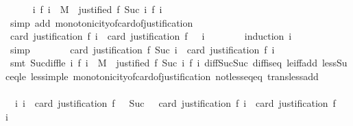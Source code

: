 \begin{isabellebody}
\ \ \ \ \isamarkupfalse%
\ {\isacartoucheopen}{\isasymforall}i{\isachardot}\ f\ i\ {\isasymin}\ M\ {\isasymand}\ justified\ {\isacharparenleft}f\ {\isacharparenleft}Suc\ i{\isacharparenright}{\isacharparenright}\ {\isacharparenleft}f\ i{\isacharparenright}{\isacartoucheclose}\ \isamarkupfalse%
\ {\isacharparenleft}simp\ add{\isacharcolon}\ monotonicity{\isacharunderscore}of{\isacharunderscore}card{\isacharunderscore}of{\isacharunderscore}justification{\isacharparenright}\isanewline
\ \ \ \ \isamarkupfalse%
\ {\isachardoublequoteopen}card\ {\isacharparenleft}justification\ {\isacharparenleft}f\ i{\isacharparenright}{\isacharparenright}\ {\isasymle}\ card\ {\isacharparenleft}justification\ {\isacharparenleft}f\ {}{\isacharparenright}{\isacharparenright}\ {\isacharminus}\ i{\isachardoublequoteclose}\isanewline
\ \ \ \ \ \ \isamarkupfalse%
\ {\isacharparenleft}induction\ i{\isacharparenright}\isanewline
\ \ \ \ \ \ \isamarkupfalse%
\ simp\isanewline
\ \ \ \ \ \ \isamarkupfalse%
\ {\isacartoucheopen}card\ {\isacharparenleft}justification\ {\isacharparenleft}f\ {\isacharparenleft}Suc\ i{\isacharparenright}{\isacharparenright}{\isacharparenright}\ {\isacharless}\ card\ {\isacharparenleft}justification\ {\isacharparenleft}f\ i{\isacharparenright}{\isacharparenright}{\isacartoucheclose}\isanewline
\ \ \ \ \ \ \isamarkupfalse%
\ {\isacharparenleft}smt\ Suc{\isacharunderscore}diff{\isacharunderscore}le\ {\isacartoucheopen}{\isasymforall}i{\isachardot}\ f\ i\ {\isasymin}\ M\ {\isasymand}\ justified\ {\isacharparenleft}f\ {\isacharparenleft}Suc\ i{\isacharparenright}{\isacharparenright}\ {\isacharparenleft}f\ i{\isacharparenright}{\isacartoucheclose}\ diff{\isacharunderscore}Suc{\isacharunderscore}Suc\ diff{\isacharunderscore}is{\isacharunderscore}{}{\isacharunderscore}eq\ le{\isacharunderscore}iff{\isacharunderscore}add\ less{\isacharunderscore}Suc{\isacharunderscore}eq{\isacharunderscore}le\ less{\isacharunderscore}imp{\isacharunderscore}le\ monotonicity{\isacharunderscore}of{\isacharunderscore}card{\isacharunderscore}of{\isacharunderscore}justification\ not{\isacharunderscore}less{\isacharunderscore}eq{\isacharunderscore}eq\ trans{\isacharunderscore}less{\isacharunderscore}add{}{\isacharparenright}\ \ \isanewline
\ \ \isamarkupfalse%
\isanewline
\ \ \isamarkupfalse%
\ \isamarkupfalse%
\ {\isachardoublequoteopen}{\isasymexists}\ i{\isachardot}\ i\ {\isacharequal}\ card\ {\isacharparenleft}justification\ {\isacharparenleft}f\ {}{\isacharparenright}{\isacharparenright}\ {\isacharplus}\ Suc\ {}\ {\isasymand}\ card\ {\isacharparenleft}justification\ {\isacharparenleft}f\ i{\isacharparenright}{\isacharparenright}\ {\isasymle}\ card\ {\isacharparenleft}justification\ {\isacharparenleft}f\ {}{\isacharparenright}{\isacharparenright}\ {\isacharminus}\ i{\isachardoublequoteclose}\isanewline

\end{isabellebody}
